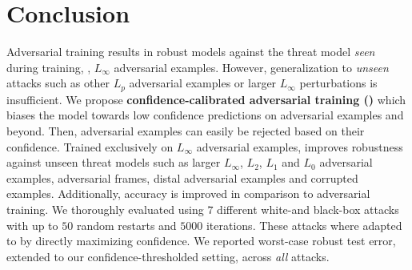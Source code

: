 \section{Conclusion}
\label{sec:conclusion}

Adversarial training results in robust models against the threat model \emph{seen} during training, \eg, $L_\infty$ adversarial examples. However, generalization to \emph{unseen} attacks such as other $L_p$ adversarial examples or larger $L_\infty$ perturbations is insufficient. We propose \textbf{confidence-calibrated adversarial training (\ConfTrain)} which biases the model towards low confidence predictions on adversarial examples and beyond. Then, adversarial examples can easily be rejected based on their confidence. Trained exclusively on $L_\infty$ adversarial examples, \ConfTrain improves robustness against unseen threat models such as larger $L_\infty$, $L_2$, $L_1$ and $L_0$ adversarial examples, adversarial frames, distal adversarial examples and corrupted examples. Additionally, accuracy is improved in comparison to adversarial training. We thoroughly evaluated \ConfTrain using $7$ different white-and black-box attacks with up to $50$ random restarts and $5000$ iterations. These attacks where adapted to \ConfTrain by directly maximizing confidence. We reported worst-case robust test error, extended to our confidence-thresholded setting, across \emph{all} attacks.